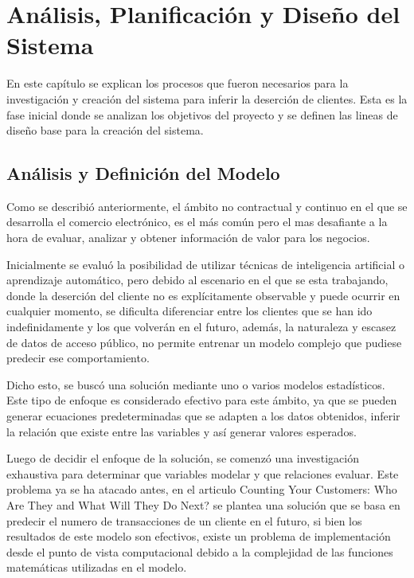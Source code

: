 
\chapter{Análisis, Planificación y Diseño del Sistema}

En este capítulo se explican los procesos que fueron necesarios para la investigación y creación del sistema para inferir la deserción de clientes. Esta es la fase inicial donde se analizan los objetivos del proyecto y se definen las lineas de diseño base para la creación del sistema.

\section{Análisis y Definición del Modelo}

Como se describió anteriormente, el ámbito no contractual y continuo en el que se desarrolla el comercio electrónico, es el más común pero el mas desafiante a la hora de evaluar, analizar y obtener información de valor para los negocios. 

	Inicialmente se evaluó la posibilidad de utilizar técnicas de inteligencia artificial o aprendizaje automático, pero debido al escenario en el que se esta trabajando, donde la deserción del cliente no es explícitamente observable y puede ocurrir en cualquier momento, se dificulta diferenciar entre los clientes que se han ido indefinidamente y los que volverán en el futuro, además, la naturaleza y escasez de datos de acceso público, no permite entrenar un modelo complejo que pudiese predecir ese comportamiento.

	Dicho esto, se buscó una solución mediante uno o varios modelos estadísticos. Este tipo de enfoque es considerado efectivo para este ámbito, ya que se pueden generar ecuaciones predeterminadas que se adapten a los datos obtenidos, inferir la relación que existe entre las variables y así generar valores esperados.

	Luego de decidir el enfoque de la solución, se comenzó una investigación exhaustiva para determinar que variables modelar y que relaciones evaluar. Este problema ya se ha atacado antes, en el articulo Counting Your Customers: Who Are They and What Will They Do Next? \cite{schmittlein1987} se plantea una solución que se basa en predecir el numero de transacciones de un cliente en el futuro, si bien los resultados de este modelo son efectivos, existe un problema de implementación desde el punto de vista computacional debido a la complejidad de las funciones matemáticas utilizadas en el modelo.

